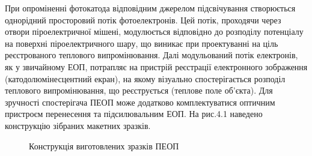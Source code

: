 \documentclass[a4paper,14pt]{extreport}
\begin{document}
При опроміненні фотокатода відповідним джерелом підсвічування створюється однорідний просторовий потік фотоелектронів. Цей потік, проходячи через отвори піроелектричної мішені, модулюється відповідно до розподілу потенціалу на
поверхні піроелектричного шару, що виникає при проектуванні на ціль реєстрованого теплового випромінювання. Далі
модульований потік електронів, як у звичайному ЕОП, потрапляє
на пристрій реєстрації електронного зображення (катодолюмінесцентний екран), на якому візуально спостерігається розподіл теплового випромінювання, що реєструється (теплове поле об'єкта).
Для зручності спостерігача ПЕОП може додатково комплектуватися оптичним пристроєм перенесення та підсилювальним ЕОП.
На рис.4.1 наведено конструкцію зібраних макетних зразків.



\begin{figure}[h!]

\caption{Конструкція виготовлених зразків ПЕОП}
\label{ris2}
\end{figure}
\end{document}
